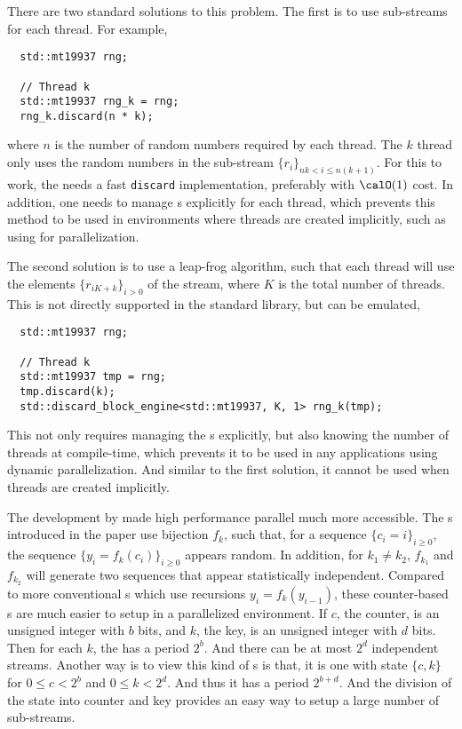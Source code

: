 There are two standard solutions to this problem. The first is to use
sub-streams for each thread. For example,
\begin{Verbatim}
  std::mt19937 rng;

  // Thread k
  std::mt19937 rng_k = rng;
  rng_k.discard(n * k);
\end{Verbatim}
where $n$ is the number of random numbers required by each thread. The $k$\ith
thread only uses the random numbers in the sub-stream $\{r_i\}_{nk < i \le
  n(k+1)}$. For this to work, the \rng needs a fast \verb|discard|
implementation, preferably with $\calO(1)$ cost. In addition, one needs to
manage \rng{}s explicitly for each thread, which prevents this method to be
used in environments where threads are created implicitly, such as using \tbb
for parallelization.

The second solution is to use a leap-frog algorithm, such that each thread will
use the elements $\{r_{iK + k}\}_{i>0}$ of the stream, where $K$ is the total
number of threads. This is not directly supported in the standard library, but
can be emulated,
\begin{Verbatim}
  std::mt19937 rng;

  // Thread k
  std::mt19937 tmp = rng;
  tmp.discard(k);
  std::discard_block_engine<std::mt19937, K, 1> rng_k(tmp);
\end{Verbatim}
This not only requires managing the \rng{}s explicitly, but also knowing the
number of threads at compile-time, which prevents it to be used in any
applications using dynamic parallelization. And similar to the first solution,
it cannot be used when threads are created implicitly.

The development by \textcite{Salmon:2011um} made high performance parallel \rng
much more accessible. The \rng{}s introduced in the paper use bijection $f_k$,
such that, for a sequence $\{c_i = i\}_{i\ge0}$, the sequence $\{y_i =
f_k(c_i)\}_{i\ge0}$ appears random. In addition, for $k_1 \ne k_2$, $f_{k_1}$
and $f_{k_2}$ will generate two sequences that appear statistically
independent. Compared to more conventional \rng{}s which use recursions $y_i =
f_k(y_{i - 1})$, these counter-based \rng{}s are much easier to setup in a
parallelized environment. If $c$, the counter, is an unsigned integer with $b$
bits, and $k$, the key, is an unsigned integer with $d$ bits. Then for each
$k$, the \rng has a period $2^b$. And there can be at most $2^d$ independent
streams. Another way is to view this kind of \rng{}s is that, it is one \rng{}
with state $\{c, k\}$ for $0 \le c < 2^b$ and $0 \le k < 2^d$. And thus it has
a period $2^{b + d}$. And the division of the state into counter and key
provides an easy way to setup a large number of sub-streams.

